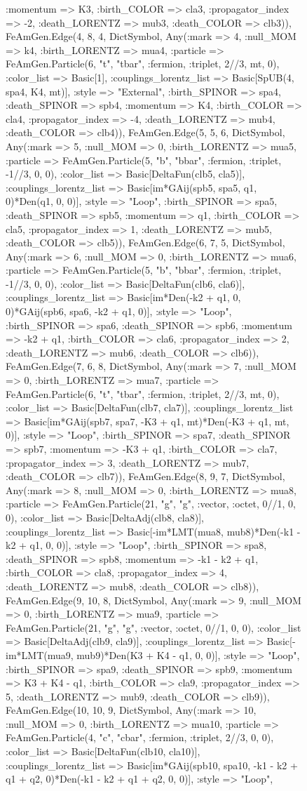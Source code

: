 \documentclass{revtex4}
\begin{document}
\begin{figure}[!htb]
\begin{center}
{:momentum => K3, :birth_COLOR => cla3, :propagator_index => -2, :death_LORENTZ => mub3, :death_COLOR => clb3)), FeAmGen.Edge(4, 8, 4, Dict{Symbol, Any}(:mark => 4, :null_MOM => k4, :birth_LORENTZ => mua4, :particle => FeAmGen.Particle(6, "t", "tbar", :fermion, :triplet, 2//3, mt, 0), :color_list => Basic[1], :couplings_lorentz_list => Basic[SpUB(4, spa4, K4, mt)], :style => "External", :birth_SPINOR => spa4, :death_SPINOR => spb4, :momentum => K4, :birth_COLOR => cla4, :propagator_index => -4, :death_LORENTZ => mub4, :death_COLOR => clb4)), FeAmGen.Edge(5, 5, 6, Dict{Symbol, Any}(:mark => 5, :null_MOM => 0, :birth_LORENTZ => mua5, :particle => FeAmGen.Particle(5, "b", "bbar", :fermion, :triplet, -1//3, 0, 0), :color_list => Basic[DeltaFun(clb5, cla5)], :couplings_lorentz_list => Basic[im*GAij(spb5, spa5, q1, 0)*Den(q1, 0, 0)], :style => "Loop", :birth_SPINOR => spa5, :death_SPINOR => spb5, :momentum => q1, :birth_COLOR => cla5, :propagator_index => 1, :death_LORENTZ => mub5, :death_COLOR => clb5)), FeAmGen.Edge(6, 7, 5, Dict{Symbol, Any}(:mark => 6, :null_MOM => 0, :birth_LORENTZ => mua6, :particle => FeAmGen.Particle(5, "b", "bbar", :fermion, :triplet, -1//3, 0, 0), :color_list => Basic[DeltaFun(clb6, cla6)], :couplings_lorentz_list => Basic[im*Den(-k2 + q1, 0, 0)*GAij(spb6, spa6, -k2 + q1, 0)], :style => "Loop", :birth_SPINOR => spa6, :death_SPINOR => spb6, :momentum => -k2 + q1, :birth_COLOR => cla6, :propagator_index => 2, :death_LORENTZ => mub6, :death_COLOR => clb6)), FeAmGen.Edge(7, 6, 8, Dict{Symbol, Any}(:mark => 7, :null_MOM => 0, :birth_LORENTZ => mua7, :particle => FeAmGen.Particle(6, "t", "tbar", :fermion, :triplet, 2//3, mt, 0), :color_list => Basic[DeltaFun(clb7, cla7)], :couplings_lorentz_list => Basic[im*GAij(spb7, spa7, -K3 + q1, mt)*Den(-K3 + q1, mt, 0)], :style => "Loop", :birth_SPINOR => spa7, :death_SPINOR => spb7, :momentum => -K3 + q1, :birth_COLOR => cla7, :propagator_index => 3, :death_LORENTZ => mub7, :death_COLOR => clb7)), FeAmGen.Edge(8, 9, 7, Dict{Symbol, Any}(:mark => 8, :null_MOM => 0, :birth_LORENTZ => mua8, :particle => FeAmGen.Particle(21, "g", "g", :vector, :octet, 0//1, 0, 0), :color_list => Basic[DeltaAdj(clb8, cla8)], :couplings_lorentz_list => Basic[-im*LMT(mua8, mub8)*Den(-k1 - k2 + q1, 0, 0)], :style => "Loop", :birth_SPINOR => spa8, :death_SPINOR => spb8, :momentum => -k1 - k2 + q1, :birth_COLOR => cla8, :propagator_index => 4, :death_LORENTZ => mub8, :death_COLOR => clb8)), FeAmGen.Edge(9, 10, 8, Dict{Symbol, Any}(:mark => 9, :null_MOM => 0, :birth_LORENTZ => mua9, :particle => FeAmGen.Particle(21, "g", "g", :vector, :octet, 0//1, 0, 0), :color_list => Basic[DeltaAdj(clb9, cla9)], :couplings_lorentz_list => Basic[-im*LMT(mua9, mub9)*Den(K3 + K4 - q1, 0, 0)], :style => "Loop", :birth_SPINOR => spa9, :death_SPINOR => spb9, :momentum => K3 + K4 - q1, :birth_COLOR => cla9, :propagator_index => 5, :death_LORENTZ => mub9, :death_COLOR => clb9)), FeAmGen.Edge(10, 10, 9, Dict{Symbol, Any}(:mark => 10, :null_MOM => 0, :birth_LORENTZ => mua10, :particle => FeAmGen.Particle(4, "c", "cbar", :fermion, :triplet, 2//3, 0, 0), :color_list => Basic[DeltaFun(clb10, cla10)], :couplings_lorentz_list => Basic[im*GAij(spb10, spa10, -k1 - k2 + q1 + q2, 0)*Den(-k1 - k2 + q1 + q2, 0, 0)], :style => "Loop", }
\end{center}
\end{figure}
\end{document}
